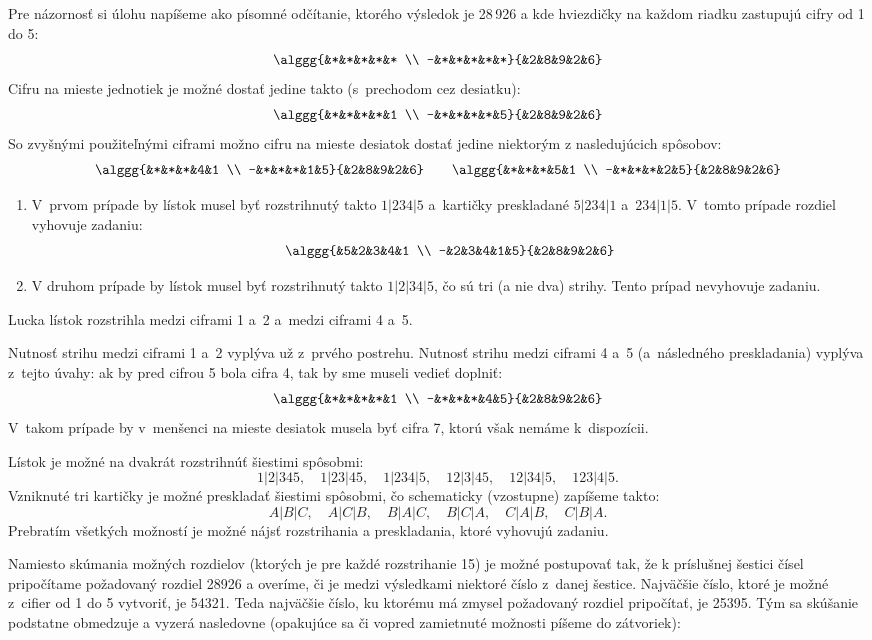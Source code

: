 {%
Pre názornosť si úlohu napíšeme ako písomné odčítanie, ktorého výsledok je 28\,926 a kde hviezdičky na každom riadku zastupujú cifry od 1 do 5:
$$
\alggg{&*&*&*&*&* \\ -&*&*&*&*&*}{&2&8&9&2&6}
$$
Cifru na mieste jednotiek je možné dostať jedine takto (s~prechodom cez desiatku):
$$
\alggg{&*&*&*&*&1 \\ -&*&*&*&*&5}{&2&8&9&2&6}
$$
So zvyšnými použiteľnými ciframi možno cifru na mieste desiatok dostať jedine niektorým z nasledujúcich spôsobov:
$$
\alggg{&*&*&*&4&1 \\ -&*&*&*&1&5}{&2&8&9&2&6}
\qquad
\alggg{&*&*&*&5&1 \\ -&*&*&*&2&5}{&2&8&9&2&6}
$$

\begin{enumerate}\alphatrue
\item
V~prvom prípade by lístok musel byť rozstrihnutý takto
$1|234|5$
a~kartičky preskladané $5|234|1$ a~$234|1|5$.
V~tomto prípade rozdiel vyhovuje zadaniu:
$$
\alggg{&5&2&3&4&1 \\ -&2&3&4&1&5}{&2&8&9&2&6}
$$
\item
V druhom prípade by lístok musel byť rozstrihnutý takto
$1|2|34|5$, čo sú tri (a nie dva) strihy.
Tento prípad nevyhovuje zadaniu.
\end{enumerate}

Lucka lístok rozstrihla medzi ciframi 1 a~2 a~medzi ciframi 4 a~5.

\poznamka
Nutnosť strihu medzi ciframi 1 a~2 vyplýva už z~prvého postrehu.
Nutnosť strihu medzi ciframi 4 a~5 (a~následného preskladania) vyplýva z~tejto úvahy:
ak by pred cifrou 5 bola cifra 4, tak by sme museli vedieť doplniť:
$$
\alggg{&*&*&*&*&1 \\ -&*&*&*&4&5}{&2&8&9&2&6}
$$
V~takom prípade by v~menšenci na mieste desiatok musela byť cifra 7, ktorú však nemáme k~dispozícii.

\ineriesenie
Lístok je možné na dvakrát rozstrihnúť šiestimi spôsobmi:
$$
1|2|345,\quad 1|23|45,\quad 1|234|5,\quad 12|3|45,\quad 12|34|5,\quad 123|4|5.
$$
Vzniknuté tri kartičky je možné preskladať šiestimi spôsobmi, čo schematicky (vzostupne) zapíšeme takto:
$$
A|B|C,\quad A|C|B,\quad B|A|C,\quad B|C|A,\quad C|A|B,\quad C|B|A.
$$
Prebratím všetkých možností je možné nájsť rozstrihania a preskladania, ktoré vyhovujú zadaniu.

Namiesto skúmania možných rozdielov (ktorých je pre každé rozstrihanie 15) je možné postupovať tak, že k príslušnej šestici čísel pripočítame požadovaný rozdiel 28926 a overíme, či je medzi výsledkami niektoré číslo z~danej šestice.
Najväčšie číslo, ktoré je možné z~cifier od 1 do 5 vytvoriť, je 54321.
Teda najväčšie číslo, ku ktorému má zmysel požadovaný rozdiel pripočítať, je 25395.
Tým sa skúšanie podstatne obmedzuje a vyzerá nasledovne
(opakujúce sa či vopred zamietnuté možnosti píšeme do zátvoriek):

}
